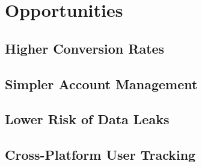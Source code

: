\newpage
\section{Opportunities}

\subsection{Higher Conversion Rates}

\subsection{Simpler Account Management}

\subsection{Lower Risk of Data Leaks}

\subsection{Cross-Platform User Tracking}